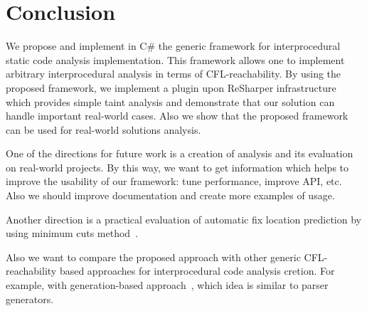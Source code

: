 \section{Conclusion}

We propose and implement in C\# the generic framework for interprocedural static code analysis implementation.
This framework allows one to implement arbitrary interprocedural analysis in terms of CFL-reachability.
By using the proposed framework, we implement a plugin upon ReSharper infrastructure which provides simple taint analysis and demonstrate that our solution can handle important real-world cases.
Also we show that the proposed framework can be used for real-world solutions analysis.

One of the directions for future work is a creation of analysis and its evaluation on real-world projects.
By this way, we want to get information which helps to improve the usability of our framework: tune performance, improve API, etc.
Also we should improve documentation and create more examples of usage.

Another direction is a practical evaluation of automatic fix location prediction by using minimum cuts method~\cite{10.1007/978-3-319-63390-9_27}.

Also we want to compare the proposed approach with other generic CFL-reachability based approaches for interprocedural code analysis cretion. For example, with generation-based approach~\cite{LPAR-21:Cauliflower_Solver_Generator_for}, which idea is similar to parser generators.
